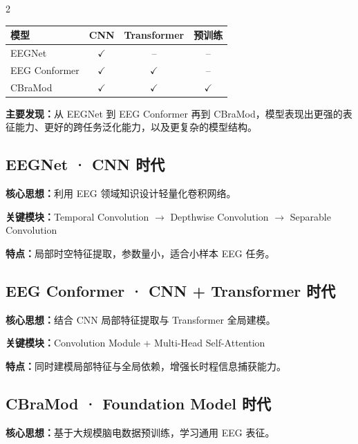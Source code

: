 \documentclass[12pt, a0paper]{article}
\begin{document}
\begin{multicols}{2}
\begin{center}
\begin{tabular}{lccc}
    \toprule
    \textbf{模型} & \textbf{CNN} & \textbf{Transformer} & \textbf{预训练} \\
    \midrule
    EEGNet        & $\checkmark$ & -- & -- \\
    EEG Conformer & $\checkmark$ & $\checkmark$ & -- \\
    CBraMod       & $\checkmark$ & $\checkmark$ & $\checkmark$ \\
    \bottomrule
\end{tabular}
\end{center}

\vspace{1em}

\textbf{主要发现：}从 EEGNet 到 EEG Conformer 再到 CBraMod，模型表现出更强的表征能力、更好的跨任务泛化能力，以及更复杂的模型结构。

\subsection{EEGNet · CNN 时代}

\textbf{核心思想：}利用 EEG 领域知识设计轻量化卷积网络。

\textbf{关键模块：}Temporal Convolution $\rightarrow$ Depthwise Convolution $\rightarrow$ Separable Convolution

\textbf{特点：}局部时空特征提取，参数量小，适合小样本 EEG 任务。

\vspace{1em}

\subsection{EEG Conformer · CNN + Transformer 时代}

\textbf{核心思想：}结合 CNN 局部特征提取与 Transformer 全局建模。

\textbf{关键模块：}Convolution Module + Multi-Head Self-Attention

\textbf{特点：}同时建模局部特征与全局依赖，增强长时程信息捕获能力。

\vspace{1em}

\subsection{CBraMod · Foundation Model 时代}

\textbf{核心思想：}基于大规模脑电数据预训练，学习通用 EEG 表征。


\end{multicols}
\end{document}
